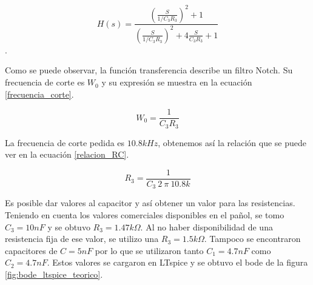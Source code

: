 \begin{equation} H(s) = \frac{(\frac{S}{1/C_{3} R_{3}})^2 + 1} {(\frac{S}{1/C_{3}R_{3}})^2 + 4\frac{S}{C_{3}R_{3}} + 1}  \label{transferencia_1}\end{equation}.

Como se puede observar, la función transferencia describe un filtro Notch. Su frecuencia de corte es
$W_0$ y su expresión se muestra en la ecuación \ref{frecuencia_corte}.

\begin{equation} W_{0} =  \frac{1}{C_{3} R_{3}}  \label{frecuencia_corte}\end{equation}

La frecuencia de corte pedida es $10.8k Hz$, obtenemos así la relación que se puede ver en la ecuación \ref{relacion_RC}.

\begin{equation} R_{3} = \frac{1}{C_{3} \  2 \ \pi \ 10.8k} \label{relacion_RC}\end{equation}

Es posible dar valores al capacitor y así obtener un valor para las resistencias. Teniendo en cuenta los valores comerciales disponibles en el pañol, se tomo $C_{3} = 10nF$ y se obtuvo $R_{3}=1.47k\Omega$. Al no haber disponibilidad de una resistencia fija de ese valor, se utilizo una $R_{3}=1.5k\Omega$. Tampoco se encontraron capacitores de $C = 5nF$ por lo que se utilizaron tanto $C_{1} = 4.7nF$ como  $C_{2} = 4.7nF$. Estos valores se cargaron en LTspice y se obtuvo el bode de la figura \ref{fig:bode_ltspice_teorico}.


